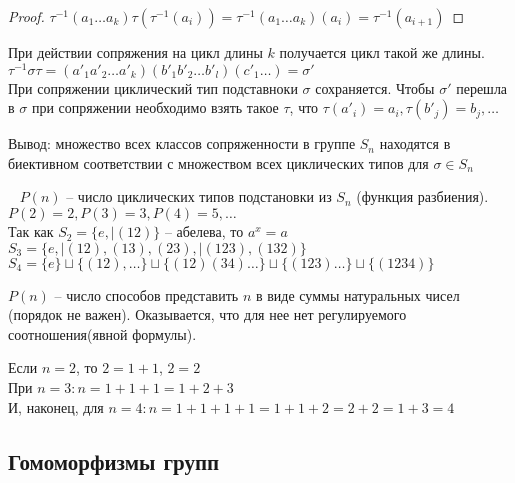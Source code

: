 \begin{proof}
    $\tau^{-1} (a_1 \ldots a_k) \tau (\tau^{-1}(a_i)) = \tau^{-1} (a_1 \ldots a_k)(a_i) = \tau^{-1}(a_{i+1})$
\end{proof}

\begin{corollary}
    При действии сопряжения на цикл длины $k$ получается цикл такой же длины. $\tau^{-1} \sigma \tau = (a'_1 a'_2 \ldots a'_k)(b'_1 b'_2 \ldots b'_l)(c'_1 \ldots) = \sigma'$ \\
    При сопряжении циклический тип подставноки $\sigma$ сохраняется. Чтобы $\sigma'$ перешла в $\sigma$ при сопряжении необходимо взять такое $\tau$, что $\tau(a'_i) = a_i, \tau(b'_j) = b_j, \ldots$
    
    Вывод: множество всех классов сопряженности в группе $S_n$ находятся в биективном соответствии с множеством всех циклических типов для $\sigma \in S_n$
\end{corollary}

\begin{example}~
    $P(n)$ -- число циклических типов подстановки из $S_n$ (функция разбиения). $P(2) = 2, P(3) = 3, P(4) = 5, \ldots$ \\
    Так как $S_2 = \{e, | (1 2)\}$ -- абелева, то $a^x = a$ \\
    $S_3 = \{e, | (1 2), (1 3), (2 3), | (1 2 3), (1 3 2)\}$ \\
    $S_4 = \{e\} \sqcup \{(1 2), \ldots\} \sqcup \{(1 2)(3 4) \ldots\} \sqcup \{(1 2 3) \ldots\} \sqcup \{(1 2 3 4)\}$
\end{example}

\begin{definition}
    $P(n)$ -- число способов представить $n$ в виде суммы натуральных чисел (порядок не важен). Оказывается, что для нее нет регулируемого соотношения(явной формулы).
\end{definition}

\begin{example}
    Если $n = 2$, то $2 = 1 + 1$, $2 = 2$ \\
    При $n = 3: n = 1 + 1 + 1 = 1 + 2 + 3$ \\
    И, наконец, для $n = 4: n = 1 + 1 + 1 + 1 = 1 + 1 + 2 = 2 + 2 = 1 + 3 = 4$
\end{example}

\subsection{Гомоморфизмы групп}

